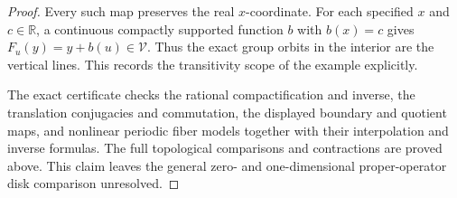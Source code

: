 \begin{proof}
Every such map preserves the real $x$-coordinate.
For each specified $x$ and $c\in\mathbb R$, a
continuous compactly supported function $b$ with
$b(x)=c$ gives $F_u(y)=y+b(u)\in\mathcal V$.
Thus the exact group orbits in the interior are
the vertical lines. This records the transitivity
scope of the example explicitly.

The exact certificate
checks the rational compactification and inverse,
the translation conjugacies and commutation,
the displayed boundary and quotient maps, and
nonlinear periodic fiber models together with
their interpolation and inverse formulas.
The full topological comparisons and contractions
are proved above. This claim leaves the general
zero- and one-dimensional proper-operator disk
comparison unresolved.
\end{proof}
